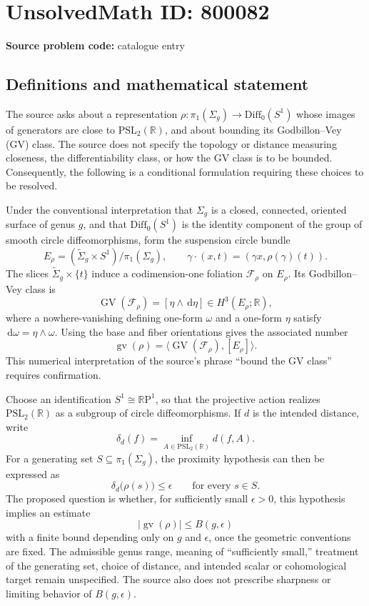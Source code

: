 \documentclass[11pt]{article}
\newcommand{\R}{\mathbb{R}}
\newcommand{\dd}{\,\mathrm{d}}
\begin{document}
\section*{UnsolvedMath ID: 800082}
\textbf{Source problem code:} catalogue entry
\subsection{Definitions and mathematical statement}
The source asks about a representation \(\rho\colon\pi_1(\Sigma_g)\to\mathrm{Diff}_0(S^1)\) whose images of generators are close to \(\mathrm{PSL}_2(\R)\), and about bounding its Godbillon--Vey (GV) class. The source does not specify the topology or distance measuring closeness, the differentiability class, or how the GV class is to be bounded. Consequently, the following is a conditional formulation requiring these choices to be resolved.

Under the conventional interpretation that \(\Sigma_g\) is a closed, connected, oriented surface of genus \(g\), and that \(\mathrm{Diff}_0(S^1)\) is the identity component of the group of smooth circle diffeomorphisms, form the suspension circle bundle
\[
E_\rho=(\widetilde{\Sigma}_g\times S^1)/\pi_1(\Sigma_g),\qquad
\gamma\cdot(x,t)=(\gamma x,\rho(\gamma)(t)).
\]
The slices \(\widetilde{\Sigma}_g\times\{t\}\) induce a codimension-one foliation \(\mathcal F_\rho\) on \(E_\rho\). Its Godbillon--Vey class is
\[
\operatorname{GV}(\mathcal F_\rho)=[\eta\wedge\dd\eta]\in H^3(E_\rho;\R),
\]
where a nowhere-vanishing defining one-form \(\omega\) and a one-form \(\eta\) satisfy \(\dd\omega=\eta\wedge\omega\). Using the base and fiber orientations gives the associated number
\[
\operatorname{gv}(\rho)=\bigl\langle\operatorname{GV}(\mathcal F_\rho),[E_\rho]\bigr\rangle.
\]
This numerical interpretation of the source's phrase ``bound the GV class'' requires confirmation.

Choose an identification \(S^1\cong\R\mathrm P^1\), so that the projective action realizes \(\mathrm{PSL}_2(\R)\) as a subgroup of circle diffeomorphisms. If \(d\) is the intended distance, write
\[
\delta_d(f)=\inf_{A\in\mathrm{PSL}_2(\R)}d(f,A).
\]
For a generating set \(S\subseteq\pi_1(\Sigma_g)\), the proximity hypothesis can then be expressed as
\[
\delta_d\bigl(\rho(s)\bigr)\leq\epsilon\qquad\text{for every }s\in S.
\]
The proposed question is whether, for sufficiently small \(\epsilon>0\), this hypothesis implies an estimate
\[
\left|\operatorname{gv}(\rho)\right|\leq B(g,\epsilon)
\]
with a finite bound depending only on \(g\) and \(\epsilon\), once the geometric conventions are fixed. The admissible genus range, meaning of ``sufficiently small,'' treatment of the generating set, choice of distance, and intended scalar or cohomological target remain unspecified. The source also does not prescribe sharpness or limiting behavior of \(B(g,\epsilon)\).
\end{document}
